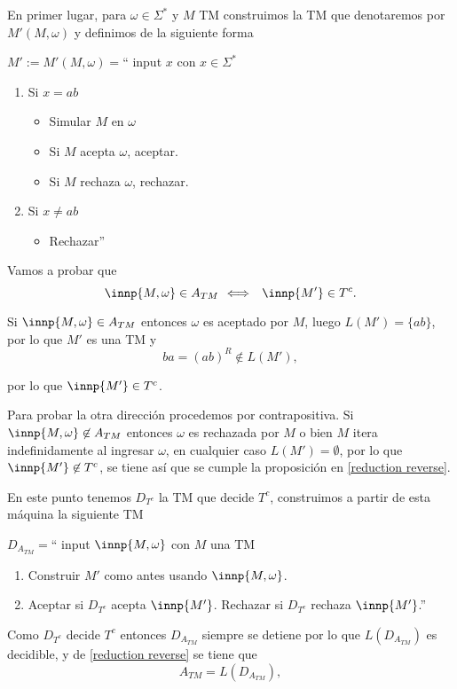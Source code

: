 \documentclass{article}
\begin{document}
En primer lugar, para $\omega\in\Sigma^*$ y $M$ TM construimos la  TM que denotaremos por $M'(M,\omega)$ y definimos de la siguiente forma


$M':=M'(M,\omega)=$`` input $x$ con $x\in\Sigma^{\ast}$ 
\begin{enumerate}
    \item Si $x=ab$
    \begin{itemize}
        \item Simular $M$ en $\omega$
        \item Si $M$ acepta $\omega$, aceptar.
        \item Si $M$ rechaza $\omega$, rechazar.
    \end{itemize}
    \item Si $x\neq ab$
    \begin{itemize}
        \item Rechazar''
    \end{itemize}
\end{enumerate}

Vamos a probar que 
\begin{equation}
    \label{reduction reverse}
    \innp{M,\omega}\in A_{TM}\ssi \innp{M'}\in T^c.
\end{equation}

Si $\innp{M,\omega}\in A_{TM}$ entonces $\omega$ es aceptado por $M$, luego $L(M')=\{ab\}$, por lo que $M'$ es una TM y 
\[
    ba=(ab)^R\not\in L(M'),
\]

por lo que $\innp{M'}\in T^c$.

Para probar la otra dirección procedemos por contrapositiva. Si $\innp{M,\omega}\not\in A_{TM}$ entonces $\omega$ es rechazada por $M$ o bien $M$ itera indefinidamente al ingresar $\omega$, en cualquier caso $L(M')=\emptyset$, por lo que $\innp{M'}\not\in T^c$,
se tiene así que se cumple la proposición en \eqref{reduction reverse}.

En este punto tenemos $D_{T^c}$ la TM que decide $T^c$, construimos a partir de esta máquina la siguiente TM 

$D_{A_{TM}}=$`` input $\innp{M,\omega}$ con $M$ una TM 
\begin{enumerate}
    \item Construir $M'$ como antes usando $\innp{M,\omega}$.
    \item Aceptar si $D_{T^c}$ acepta $\innp{M'}$. Rechazar si $D_{T^c}$ rechaza $\innp{M'}$.''
\end{enumerate}

Como $D_{T^c}$ decide $T^c$ entonces $D_{A_{TM}}$ siempre se detiene por lo que $L(D_{A_{TM}})$ es decidible, y de \eqref{reduction reverse} se tiene que 
\[
    A_{TM}=L(D_{A_{TM}}),
\]
\end{document}
